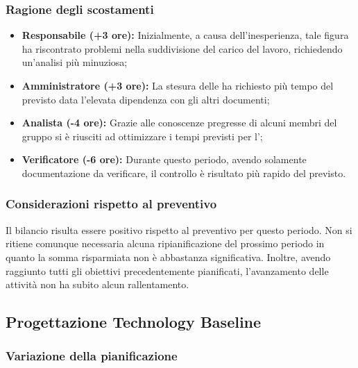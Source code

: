\subsubsection{Ragione degli scostamenti} \label{subsubsection:ragione_scostamenti_analisi}
\begin{itemize}
  \item \textbf{Responsabile (+3 ore):} Inizialmente, a causa dell'inesperienza, tale figura ha riscontrato problemi nella suddivisione del carico del lavoro, richiedendo un'analisi più minuziosa;
  \item \textbf{Amministratore (+3 ore):} La stesura delle \docNameNdP{} ha richiesto più tempo del previsto data l'elevata dipendenza con gli altri documenti;
  \item \textbf{Analista (-4 ore):} Grazie alle conoscenze pregresse di alcuni membri del gruppo si è riusciti ad ottimizzare i tempi previsti per l'\docNameAdR{};
  \item \textbf{Verificatore (-6 ore):} Durante questo periodo, avendo solamente documentazione da verificare, il controllo è risultato più rapido del previsto.
\end{itemize}

\subsubsection{Considerazioni rispetto al preventivo} \label{subsubsection:considerazioni_finali_analisi}
Il bilancio risulta essere positivo rispetto al preventivo per questo periodo. Non si ritiene comunque necessaria alcuna ripianificazione del prossimo periodo in quanto la somma risparmiata non è abbastanza significativa.
Inoltre, avendo raggiunto tutti gli obiettivi precedentemente pianificati, l'avanzamento delle attività non ha subito alcun rallentamento.
\pagebreak

\subsection{Progettazione Technology Baseline} \label{subsection:consuntivo_TB}
\subsubsection{Variazione della pianificazione} \label{subsubsection:variazione_pianificazione_TB}

